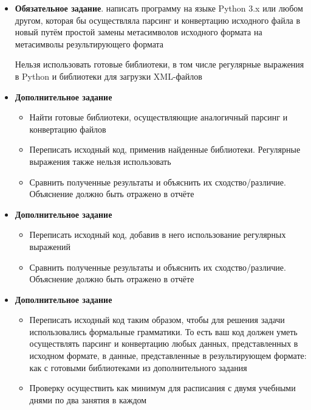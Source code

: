 \begin{itemize}
	\item  \textbf{Обязательное задание}. написать программу на языке Python 3.x или любом другом, которая бы осуществляла парсинг и конвертацию исходного файла в новый путём простой замены метасимволов исходного формата на метасимволы результирующего формата
	
	Нельзя использовать готовые библиотеки, в том числе регулярные выражения в Python и библиотеки для загрузки XML-файлов
	
	\item \textbf{Дополнительное задание }
	\begin{itemize}
		\item Найти готовые библиотеки, осуществляющие аналогичный парсинг и конвертацию файлов
		
		\item Переписать исходный код, применив найденные библиотеки. Регулярные выражения также нельзя использовать
		
		\item Сравнить полученные результаты и объяснить их сходство/различие. Объяснение должно быть отражено в отчёте
	\end{itemize}
	
	\item \textbf{Дополнительное задание }
	\begin{itemize}
		\item Переписать исходный код, добавив в него использование регулярных выражений

		\item Сравнить полученные результаты и объяснить их сходство/различие. Объяснение должно быть отражено в отчёте
	\end{itemize}
	
	\item \textbf{Дополнительное задание }
	\begin{itemize}
		\item Переписать исходный код таким образом, чтобы для решения задачи использовались формальные грамматики. То есть ваш код должен уметь осуществлять парсинг и конвертацию любых данных, представленных в исходном формате, в данные, представленные в результирующем формате: как с готовыми библиотеками из дополнительного задания 
		
		\item Проверку осуществить как минимум для расписания с двумя учебными днями по два занятия в каждом
		

\end{itemize}
\end{itemize}

